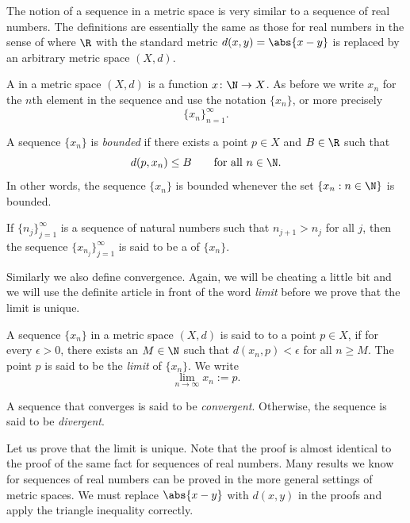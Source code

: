 \documentclass[12pt]{book}
\begin{document}
The notion of a sequence in a metric space is very similar to a sequence of
real numbers.
The definitions are essentially the same as those for real numbers
in the sense of  where $\R$ with
the standard metric $d(x,y)=\abs{x-y}$ is replaced
by an arbitrary metric space $(X,d)$.


\begin{defn}
A \emph{} in a metric space $(X,d)$ is a function
$x \colon \N \to X$.
As before we write $x_n$ for the $n$th element in
the sequence and use the notation $\{ x_n \}$, or more precisely
\begin{equation*}
\{ x_n \}_{n=1}^\infty .
\end{equation*}

A sequence $\{ x_n \}$ is \emph{bounded} if
there exists a point $p \in X$ and $B \in \R$ such that
\begin{equation*}
d(p,x_n) \leq B \qquad \text{for all $n \in \N$.}
\end{equation*}
In other words, the sequence $\{x_n\}$ is bounded whenever
the set $\{ x_n : n \in \N \}$
is bounded.

If $\{ n_j \}_{j=1}^\infty$ is a sequence of natural numbers
such that $n_{j+1} > n_j$ for all $j$, then
the sequence $\{ x_{n_j} \}_{j=1}^\infty$ is said to be
a \emph{} of $\{x_n \}$.
\end{defn}

Similarly we also define convergence.
Again, we will be cheating a little
bit and we will use the definite article in front of the word \emph{limit}
before we prove that the limit is unique.

\begin{defn}
A sequence $\{ x_n \}$ in a metric space $(X,d)$ is said
to \emph{} to a point
$p \in X$, if for every $\epsilon > 0$, there exists an $M \in \N$ such
that $d(x_n,p) < \epsilon$ for all $n \geq M$.
The point $p$
is said to be the \emph{limit}
of $\{ x_n \}$.
We write
\begin{equation*}
\lim_{n\to \infty} x_n := p .
\end{equation*}

A sequence
that converges is said to be \emph{convergent}.
Otherwise, the sequence is said to be
\emph{divergent}.
\end{defn}

Let us prove that the limit is unique.
Note that the proof is almost
identical to the proof of the same fact for sequences of real numbers.
Many results we know for sequences of real numbers can be proved in
the more general settings of metric spaces.
We must replace $\abs{x-y}$
with $d(x,y)$ in the proofs and apply the triangle inequality correctly.
\end{document}
